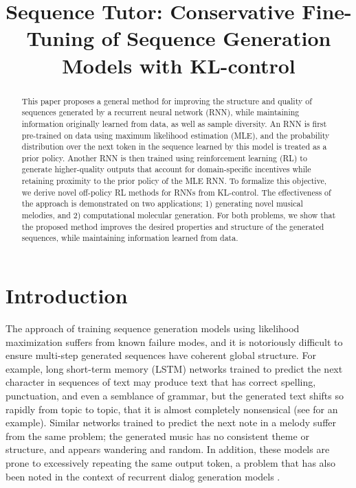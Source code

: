 \title{Sequence Tutor: Conservative Fine-Tuning of Sequence Generation Models with KL-control}

\begin{abstract}
This paper proposes a general method for improving the structure and quality of sequences generated by a recurrent neural network (RNN), while maintaining information originally learned from data, as well as sample diversity. An RNN is first pre-trained on data using maximum likelihood estimation (MLE), and the probability distribution over the next token in the sequence learned by this model is treated as a prior policy. Another RNN is then trained using reinforcement learning (RL) to generate higher-quality outputs that account for domain-specific incentives while retaining proximity to the prior policy of the MLE RNN. To formalize this objective, we derive novel off-policy RL methods for RNNs from KL-control. The effectiveness of the approach is demonstrated on two applications; 1) generating novel musical melodies, and 2) computational molecular generation. For both problems, we show that the proposed method improves the desired properties and structure of the generated sequences, while maintaining information learned from data.
\end{abstract}

\section{Introduction}
The approach of training sequence generation models using likelihood maximization suffers from known failure modes, and it is notoriously difficult to ensure multi-step generated sequences have coherent global structure. For example, long short-term memory (LSTM) \cite{lstm} networks trained to predict the next character in sequences of text may produce text that has correct spelling, punctuation, and even a semblance of grammar, but the generated text shifts so rapidly from topic to topic, that it is almost completely nonsensical (see \cite{graves} for an example). Similar networks trained to predict the next note in a melody suffer from the same problem; the generated music has no consistent theme or structure, and appears wandering and random. In addition, these models are prone to excessively repeating the same output token, a problem that has also been noted in the context of recurrent dialog generation models \cite{li2016deep}.

